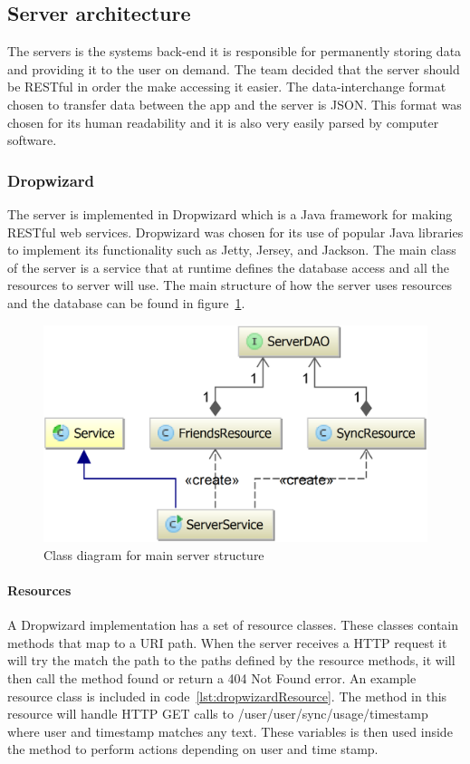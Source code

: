 \label{sec:arch_server}
\subsection{Server architecture}
The servers is the systems back-end it is responsible for permanently storing data and providing it to the user on demand. The team decided that the server should be RESTful in order the make accessing it easier. The data-interchange format chosen to transfer data between the app and the server is JSON. This format was chosen for its human readability and it is also very easily parsed by computer software.

\subsubsection{Dropwizard}
The server is implemented in Dropwizard which is a Java framework for making RESTful web services. Dropwizard was chosen for its use of popular Java libraries to implement its functionality such as Jetty, Jersey, and Jackson. The main class of the server is a service that at runtime defines the database access and all the resources to server will use. The main structure of how the server uses resources and the database can be found in figure~\ref{fig:classDiagramServer}.

\begin{figure}[H]
\includegraphics[width=\textwidth]{ch/architecture/fig/classDiagramServer.png}
\caption{Class diagram for main server structure}
\label{fig:classDiagramServer}
\end{figure}

\paragraph{Resources}
A Dropwizard implementation has a set of resource classes. These classes contain methods that map to a URI path. When the server receives a HTTP request it will try the match the path to the paths defined by the resource methods, it will then call the method found or return a 404 Not Found error. An example resource class is included in code~\ref{lst:dropwizardResource}. The method in this resource will handle HTTP GET calls to /user/{user}/sync/usage/{timestamp} where {user} and {timestamp} matches any text. These variables is then used inside the method to perform actions depending on user and time stamp.
\newpage

